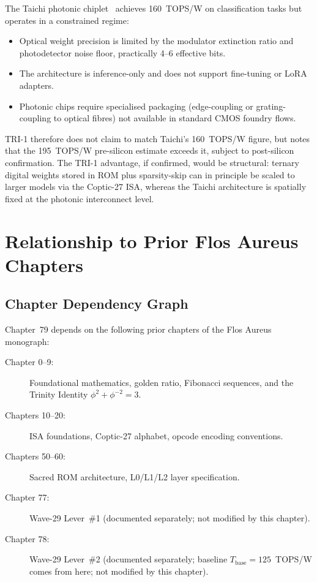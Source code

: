 The Taichi photonic chiplet~\cite{xu2024taichi} achieves 160~TOPS/W
on classification tasks but operates in a constrained regime:
\begin{itemize}
  \item Optical weight precision is limited by the modulator extinction
        ratio and photodetector noise floor, practically 4--6 effective bits.
  \item The architecture is inference-only and does not support
        fine-tuning or LoRA adapters.
  \item Photonic chips require specialised packaging (edge-coupling
        or grating-coupling to optical fibres) not available in
        standard CMOS foundry flows.
\end{itemize}
TRI-1 therefore does not claim to match Taichi's 160~TOPS/W figure,
but notes that the 195~TOPS/W pre-silicon estimate exceeds it, subject
to post-silicon confirmation.
The TRI-1 advantage, if confirmed, would be structural: ternary digital
weights stored in ROM plus sparsity-skip can in principle be scaled to
larger models via the Coptic-27 ISA, whereas the Taichi architecture
is spatially fixed at the photonic interconnect level.

\section{Relationship to Prior Flos Aureus Chapters}
\label{sec:ch79-prior-chapters}

\subsection{Chapter Dependency Graph}
\label{subsec:ch79-chapter-deps}

Chapter~79 depends on the following prior chapters of the
Flos Aureus monograph:

\begin{description}
  \item[Chapter 0--9:] Foundational mathematics, golden ratio,
        Fibonacci sequences, and the Trinity Identity
        $\phi^2 + \phi^{-2} = 3$.
  \item[Chapters 10--20:] ISA foundations, Coptic-27 alphabet,
        opcode encoding conventions.
  \item[Chapters 50--60:] Sacred ROM architecture, L0/L1/L2 layer
        specification.
  \item[Chapter 77:] Wave-29 Lever~\#1 (documented separately;
        not modified by this chapter).
  \item[Chapter 78:] Wave-29 Lever~\#2 (documented separately;
        baseline $T_{\mathrm{base}} = 125$~TOPS/W comes from here;
        not modified by this chapter).
\end{description}

